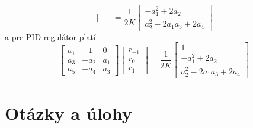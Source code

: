 \documentclass[a4paper, 10pt, ]{article}
\begin{document}
\begin{itemize}[leftmargin=0pt, labelsep=3mm, itemsep=0pt]
\begin{equation}
\begin{bmatrix}
        \end{bmatrix}
        =
        \frac{1}{2K}
        \begin{bmatrix}
            -a_1^2 + 2 a_2 \\ a_2^2 - 2 a_1a_3 + 2a_4
        \end{bmatrix}
    \end{equation}
    a pre PID regulátor platí
    \begin{equation}
        \begin{bmatrix}
            a_1 & -1 & 0 \\ a_3 & -a_2 & a_1 \\ a_5 & -a_4 & a_3
        \end{bmatrix}
        \begin{bmatrix}
            r_{-1} \\ r_0 \\ r_1
        \end{bmatrix}
        =
        \frac{1}{2K}
        \begin{bmatrix}
            1 \\ -a_1^2 + 2 a_2 \\ a_2^2 - 2 a_1a_3 + 2a_4
        \end{bmatrix}
    \end{equation}
\end{itemize}








\section{Otázky a úlohy}
\end{document}

